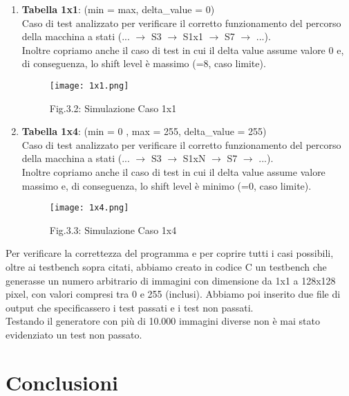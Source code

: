 \documentclass[12pt, table, xcdraw]{article}
\begin{document}
\begin{enumerate}
\item \textbf{Tabella 1x1}: (min = max, delta\_value = 0)\\
Caso di test analizzato per verificare il corretto funzionamento del percorso della macchina a stati (... $\rightarrow$ S3 $\rightarrow$ S1x1 $\rightarrow$ S7 $\rightarrow$ ...).\\
Inoltre copriamo anche il caso di test in cui il delta value assume valore 0 e, di conseguenza, lo shift level è massimo (=8, caso limite).

\begin{figure}[h!]
\begin{center}
  \texttt{[image: 1x1.png]}
\caption*{Fig.3.2: Simulazione Caso 1x1}
\end{center}
\end{figure}
\FloatBarrier

\item \textbf{Tabella 1x4}: (min = 0 , max = 255, delta\_value = 255)\\
Caso di test analizzato per verificare il corretto funzionamento del percorso della macchina a stati (... $\rightarrow$ S3 $\rightarrow$ S1xN $\rightarrow$ S7 $\rightarrow$ ...).\\
Inoltre copriamo anche il caso di test in cui il delta value assume valore massimo e, di conseguenza, lo shift level è minimo (=0, caso limite).

\begin{figure}[h!]
\begin{center}
  \texttt{[image: 1x4.png]}
\caption*{Fig.3.3: Simulazione Caso 1x4}
\end{center}
\end{figure}
\FloatBarrier

\end{enumerate}

Per verificare la correttezza del programma e per coprire tutti i casi possibili, oltre ai testbench sopra citati, abbiamo creato in codice C un testbench che generasse un numero arbitrario di immagini con dimensione da 1x1 a 128x128 pixel, con valori compresi
tra 0 e 255 (inclusi). Abbiamo poi inserito due file di output che specificassero i test passati e i test non passati. \\
Testando il generatore con più di 10.000 immagini diverse non è mai stato evidenziato un test non passato.



\section{Conclusioni}
\end{document}
